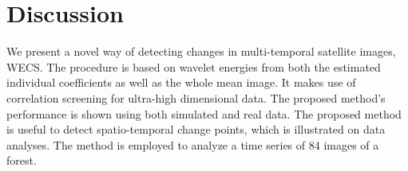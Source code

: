 \documentclass[journal]{IEEEtran}
\begin{document}
\section{Discussion}\label{section_discussion}

We present a novel way of detecting changes in multi-temporal satellite images, WECS. The procedure is based on wavelet energies from both the estimated individual coefficients as well as the whole mean image. It makes use of correlation screening for ultra-high dimensional data. The proposed method's performance is shown using both simulated and real data. The proposed method is useful to detect spatio-temporal change points, which is illustrated on data analyses. The method is employed to analyze a time series of 84 images of a forest.





%

%

\end{document}
